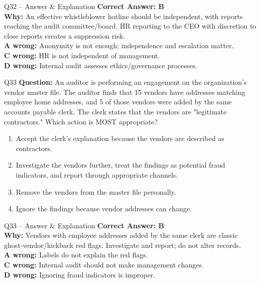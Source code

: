 \documentclass[aspectratio=169,10pt]{beamer}
\begin{document}
	\begin{frame}[t]{Q32 -- Answer \& Explanation}
		\small
		\textbf{Correct Answer: B} \\[4pt]
		\textbf{Why:} An effective whistleblower hotline should be independent, with reports reaching the audit committee/board. HR reporting to the CEO with discretion to close reports creates a suppression risk. \\[4pt]
		\textbf{A wrong:} Anonymity is not enough; independence and escalation matter. \\[2pt]
		\textbf{C wrong:} HR is not independent of management. \\[2pt]
		\textbf{D wrong:} Internal audit assesses ethics/governance processes.
	\end{frame}
	
	\begin{frame}[t]{Q33}
		\small
		\textbf{Question:} An auditor is performing an engagement on the organization's vendor master file. The auditor finds that 15 vendors have addresses matching employee home addresses, and 5 of those vendors were added by the same accounts payable clerk. The clerk states that the vendors are "legitimate contractors." Which action is MOST appropriate?
		\begin{enumerate}[label=\Alph*.,itemsep=1pt,topsep=2pt]
			\item Accept the clerk's explanation because the vendors are described as contractors.
			\item Investigate the vendors further, treat the findings as potential fraud indicators, and report through appropriate channels.
			\item Remove the vendors from the master file personally.
			\item Ignore the findings because vendor addresses can change.
		\end{enumerate}
	\end{frame}
	
	\begin{frame}[t]{Q33 -- Answer \& Explanation}
		\small
		\textbf{Correct Answer: B} \\[4pt]
		\textbf{Why:} Vendors with employee addresses added by the same clerk are classic ghost-vendor/kickback red flags. Investigate and report; do not alter records. \\[4pt]
		\textbf{A wrong:} Labels do not explain the red flags. \\[2pt]
		\textbf{C wrong:} Internal audit should not make management changes. \\[2pt]
		\textbf{D wrong:} Ignoring fraud indicators is improper.
	\end{frame}
	
\end{document}
